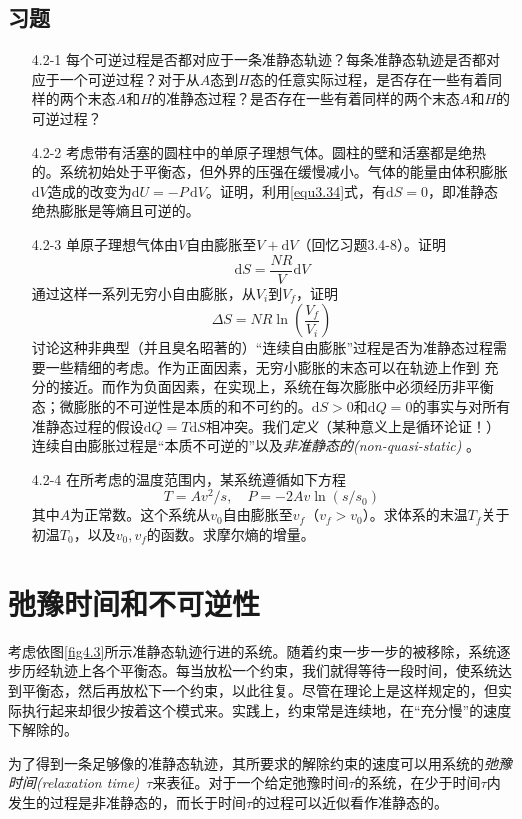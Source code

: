 \subsection*{习题}
\begin{itemize}
\item[4.2-1] 每个可逆过程是否都对应于一条准静态轨迹？每条准静态轨迹是否都对应于一个可逆过程？对于从$A$态到$H$态的任意实际过程，是否存在一些有着同样的两个末态$A$和$H$的准静态过程？是否存在一些有着同样的两个末态$A$和$H$的可逆过程？
\item[4.2-2] 考虑带有活塞的圆柱中的单原子理想气体。圆柱的壁和活塞都是绝热的。系统初始处于平衡态，但外界的压强在缓慢减小。气体的能量由体积膨胀$\mathrm dV$造成的改变为$\mathrm dU=-P\,\mathrm dV$。证明，利用\eqref{equ3.34}式，有$\mathrm dS=0$，即准静态绝热膨胀是等熵且可逆的。
\item[4.2-3] 单原子理想气体由$V$自由膨胀至$V+\mathrm dV$（回忆习题3.4-8）。证明
\[
\mathrm dS = \frac{NR}{V}\mathrm dV
\]
通过这样一系列无穷小自由膨胀，从$V_i$到$V_f$，证明
\[
\Delta S = NR\ln(\frac{V_f}{V_i})
\]
讨论这种非典型（并且臭名昭著的）“连续自由膨胀”过程是否为准静态过程需要一些精细的考虑。作为正面因素，无穷小膨胀的末态可以在轨迹上作到%
%
充分的接近。而作为负面因素，在实现上，系统在每次膨胀中必须经历非平衡态；微膨胀的不可逆性是本质的和不可约的。$\mathrm dS>0$和$\mathrm dQ=0$的事实与对所有准静态过程的假设$\mathrm dQ=T\mathrm dS$相冲突。我们{\it 定义}（某种意义上是循环论证！）连续自由膨胀过程是“本质不可逆的”以及{\it 非准静态的(non-quasi-static)}%
。
\item[4.2-4] 在所考虑的温度范围内，某系统遵循如下方程
\[
T=Av^2/s, \quad P=-2Av\ln(s/s_0)
\]
其中$A$为正常数。这个系统从$v_0$自由膨胀至$v_f$（$v_f>v_0$）。求体系的末温$T_f$关于初温$T_0$，以及$v_0,v_f$的函数。求摩尔熵的增量。
\end{itemize}

\section{弛豫时间和不可逆性}\label{sec4.3}
考虑依图\ref{fig4.3}所示准静态轨迹行进的系统。随着约束一步一步的被移除，系统逐步历经轨迹上各个平衡态。每当放松一个约束，我们就得等待一段时间，使系统达到平衡态，然后再放松下一个约束，以此往复。尽管在理论上是这样规定的，但实际执行起来却很少按着这个模式来。实践上，约束常是连续地，在“充分慢”的速度下解除的。

为了得到一条足够像的准静态轨迹，其所要求的解除约束的速度可以用系统的{\it 弛豫时间(relaxation time)}\, $\tau$来表征。对于一个给定弛豫时间$\tau$的系统，在少于时间$\tau$内发生的过程是非准静态的，而长于时间$\tau$的过程可以近似看作准静态的。

